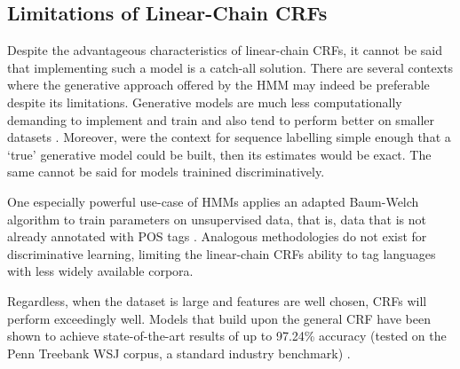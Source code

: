\documentclass[../main.tex]{subfiles}
\begin{document}
\subsection{Limitations of Linear-Chain CRFs}

Despite the advantageous characteristics of linear-chain CRFs, it cannot be said that implementing such a model is a catch-all solution.
There are several contexts where the generative approach offered by the HMM may indeed be preferable despite its limitations.
Generative models are much less computationally demanding to implement and train and also tend to perform better on smaller datasets \autocite{andrew-generative-discriminative-2001}.
Moreover, were the context for sequence labelling simple enough that a `true' generative model could be built, then its estimates would be exact. The same cannot be said for models trainined discriminatively.

One especially powerful use-case of HMMs applies an adapted Baum-Welch algorithm to train parameters on unsupervised data, that is, data that is not already annotated with POS tags \autocite{kupiec-1992-hmm}.
Analogous methodologies do not exist for discriminative learning, limiting the linear-chain CRFs ability to tag languages with less widely available corpora.

Regardless, when the dataset is large and features are well chosen, CRFs will perform exceedingly well.
Models that build upon the general CRF have been shown to achieve state-of-the-art results of up to 97.24\% accuracy (tested on the Penn Treebank WSJ corpus, a standard industry benchmark) \autocite{tout-pos2003}.
\end{document}
